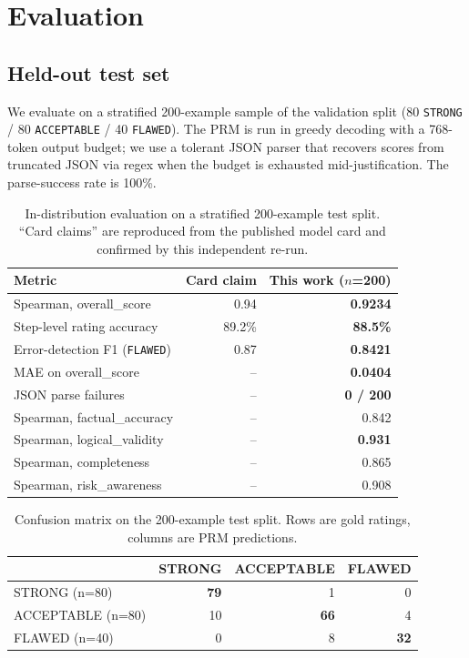 \documentclass[10pt,letterpaper]{article}
\begin{document}
\section{Evaluation}
\label{sec:eval}

\subsection{Held-out test set}

We evaluate on a stratified 200-example sample of the validation split (80 \texttt{STRONG} / 80 \texttt{ACCEPTABLE} / 40 \texttt{FLAWED}). The PRM is run in greedy decoding with a 768-token output budget; we use a tolerant JSON parser that recovers scores from truncated JSON via regex when the budget is exhausted mid-justification. The parse-success rate is 100\%.

\begin{table}[!ht]
\centering
\small
\caption{In-distribution evaluation on a stratified 200-example test split. ``Card claims'' are reproduced from the published model card and confirmed by this independent re-run.}
\label{tab:eval-id}
\begin{tabular}{lrr}
\toprule
\textbf{Metric} & \textbf{Card claim} & \textbf{This work ($n$=200)} \\
\midrule
Spearman, overall\_score                & 0.94    & \textbf{0.9234} \\
Step-level rating accuracy              & 89.2\%  & \textbf{88.5\%} \\
Error-detection F1 (\texttt{FLAWED})    & 0.87    & \textbf{0.8421} \\
MAE on overall\_score                   & --      & \textbf{0.0404} \\
JSON parse failures                     & --      & \textbf{0 / 200} \\
\midrule
Spearman, factual\_accuracy             & --      & 0.842 \\
Spearman, logical\_validity             & --      & \textbf{0.931} \\
Spearman, completeness                  & --      & 0.865 \\
Spearman, risk\_awareness               & --      & 0.908 \\
\bottomrule
\end{tabular}
\end{table}

\begin{table}[!ht]
\centering
\small
\caption{Confusion matrix on the 200-example test split. Rows are gold ratings, columns are PRM predictions.}
\label{tab:confusion}
\begin{tabular}{lrrr}
\toprule
 & STRONG & ACCEPTABLE & FLAWED \\
\midrule
STRONG (n=80)         & \textbf{79} & 1  & 0  \\
ACCEPTABLE (n=80)     & 10          & \textbf{66} & 4  \\
FLAWED (n=40)         & 0           & 8  & \textbf{32} \\
\bottomrule
\end{tabular}
\end{table}
\end{document}
